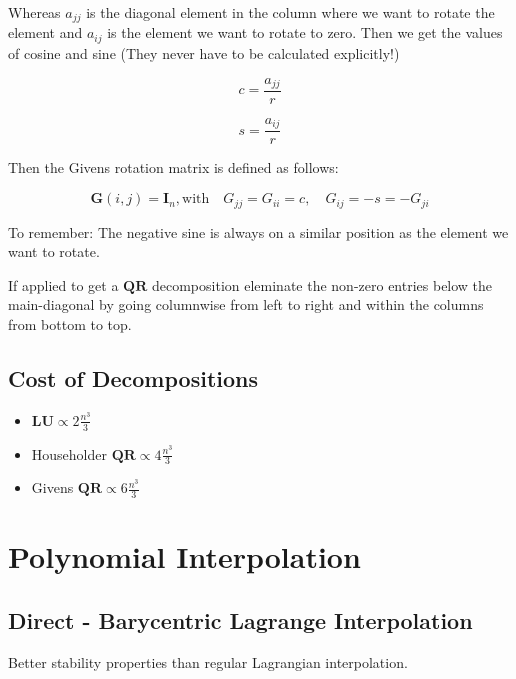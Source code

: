 \documentclass[
    a4paper,
    11pt
]{article}
\begin{document}
Whereas $a_{jj}$ is the diagonal element in the column where we want to rotate
the element and $a_{ij}$ is the element we want to rotate to zero. Then we get
the values of cosine and sine (They never have to be calculated explicitly!)

\begin{equation}
    c = \frac{a_{jj}}{r}
\end{equation}

\begin{equation}
    s = \frac{a_{ij}}{r}
\end{equation}

Then the Givens rotation matrix is defined as follows:

\begin{equation}
    \mathbf{G}(i, j) = \mathbf{I}_n, \text{with} \quad
    G_{jj} = G_{ii} = c, \quad G_{ij} = -s = -G_{ji}
\end{equation}

To remember: The negative sine is always on a similar position as the element we
want to rotate.


If applied to get a $\mathbf{QR}$ decomposition eleminate the non-zero entries
below the main-diagonal by going columnwise from left to right and within the
columns from bottom to top.

\subsection{Cost of Decompositions}

\begin{itemize}
    \item $\mathbf{LU} \propto 2\frac{n^3}{3}$
    \item Householder $\mathbf{QR} \propto 4\frac{n^3}{3}$
    \item Givens $\mathbf{QR} \propto 6\frac{n^3}{3}$

\end{itemize}

\section{Polynomial Interpolation}

\subsection{Direct - Barycentric Lagrange Interpolation}


Better stability properties than regular Lagrangian interpolation.
\end{document}
